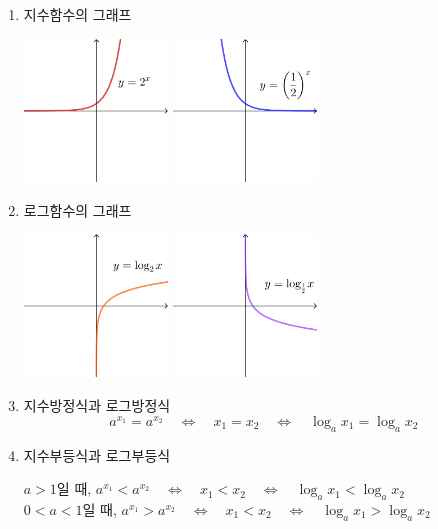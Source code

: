 \documentclass{oblivoir}
\begin{document}
\begin{enumerate}[label=\arabic*.,itemsep=40pt]
\item
지수함수의 그래프
\begin{center}
\includegraphics[width=0.3\textwidth]{summary_1}
\qquad\quad
\includegraphics[width=0.3\textwidth]{summary_2}
\end{center}
\item
로그함수의 그래프
\begin{center}
\includegraphics[width=0.3\textwidth]{summary_3}
\qquad\quad
\includegraphics[width=0.3\textwidth]{summary_4}
\end{center}
\item
지수방정식과 로그방정식
\[a^{x_1}=a^{x_2}\quad\Longleftrightarrow\quad x_1=x_2\quad\Longleftrightarrow\quad \log_a{x_1}=\log_a{x_2}\]
\item
지수부등식과 로그부등식
\begin{center}
\(a>1\)일 때,
\(a^{x_1}<a^{x_2}\quad\Longleftrightarrow\quad x_1<x_2\quad\Longleftrightarrow\quad \log_ax_1<\log_ax_2\)\\
\(0<a<1\)일 때,
\(a^{x_1}>a^{x_2}\quad\Longleftrightarrow\quad x_1<x_2\quad\Longleftrightarrow\quad \log_ax_1>\log_ax_2\)
\end{center}

\end{enumerate}
\end{document}
